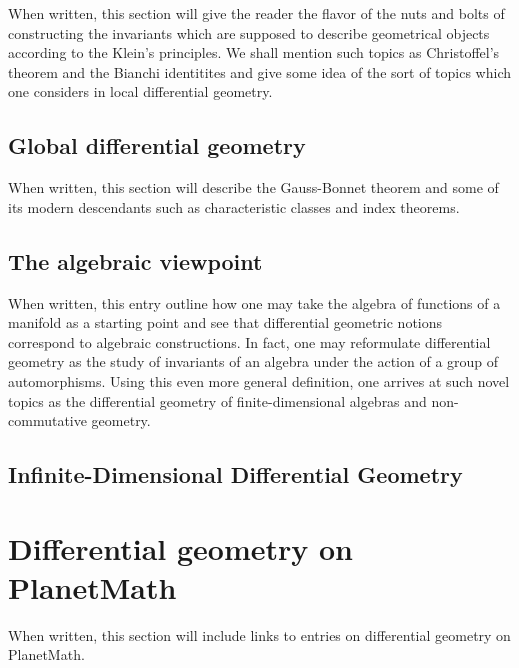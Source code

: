 \documentclass[12pt]{article}
\begin{document}
When written, this section will give the reader the flavor of the nuts and bolts of constructing the invariants which are supposed to describe geometrical objects according to the Klein's principles.  We shall mention such topics as Christoffel's theorem and the Bianchi identitites and give some idea of the sort of topics which one considers in local differential geometry.

\subsection{Global differential geometry}

When written, this section will describe the Gauss-Bonnet theorem and some of its modern descendants such as characteristic classes and index theorems.

\subsection{The algebraic viewpoint}

When written, this entry outline how one may take the algebra of functions of a manifold as a starting point and see that differential geometric notions correspond to algebraic constructions.  In fact, one may reformulate differential geometry as the study of invariants of an algebra under the action of a group of automorphisms.  Using this even more general definition, one arrives at such novel topics as the differential geometry of finite-dimensional algebras and non-commutative geometry.

\subsection{Infinite-Dimensional Differential Geometry}

\section{Differential geometry on PlanetMath}

When written, this section will include links to entries on differential geometry on PlanetMath.
\end{document}
